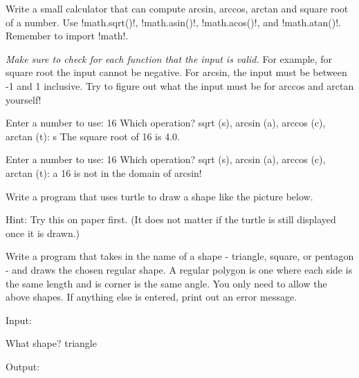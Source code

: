 \documentclass[11pt]{cselabheader}
\begin{document}
\begin{ex}[calculator.py] Write a small calculator that can compute arcsin, arccos,
    arctan and square root of a number. Use \pythoninline!math.sqrt()!,
    \pythoninline!math.asin()!, \pythoninline!math.acos()!, and
    \pythoninline!math.atan()!. Remember to import \pythoninline!math!.

    \emph{Make sure to check for each function that the input is valid.} For
    example, for square root the input cannot be negative. For arcsin, the input
    must be between -1 and 1 inclusive. Try to figure out what the input must be
    for arccos and arctan yourself!

    \begin{verbatimcode}
Enter a number to use: 16
Which operation? sqrt (s), arcsin (a), arccos (c), arctan (t): s
The square root of 16 is 4.0.
    \end{verbatimcode}

    \begin{verbatimcode}
Enter a number to use: 16
Which operation? sqrt (s), arcsin (a), arccos (c), arctan (t): a
16 is not in the domain of arcsin!
    \end{verbatimcode}

\end{ex}

\begin{ex}[star.py] Write a program that uses turtle to draw a shape like
	the picture below.
  
    \begin{center}
    \end{center}

    Hint: Try this on paper first. (It does not matter if the turtle is still
    displayed once it is drawn.)
  \end{ex}

  \begin{ex}[polygons.py] Write a program that takes in the name of a shape -
  	triangle, square, or pentagon - and draws the chosen regular shape. A regular
  	polygon is one where each side is the same length and is corner is the same
  	angle. You only need to allow the above shapes. If anything else is entered,
  	print out an error message.

    Input:

    \begin{verbatimcode}
What shape? triangle
    \end{verbatimcode}

    Output:
    \begin{center}
    \end{center}
\end{ex}
\end{document}
